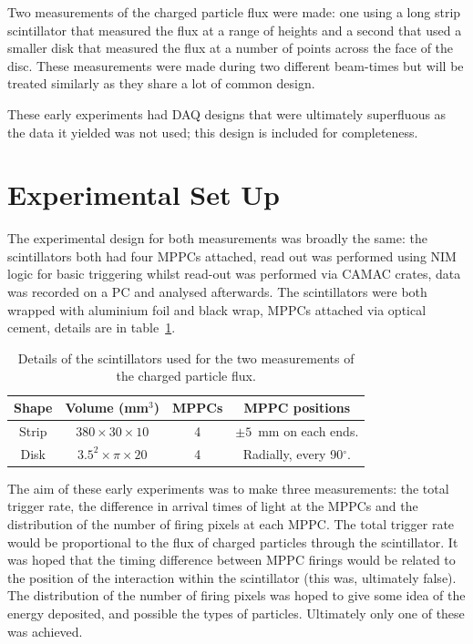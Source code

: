 Two measurements of the charged particle flux were made: one using a long strip scintillator that measured the flux at a range of heights and a second that used a smaller disk that measured the flux at a number of points across the face of the disc. These measurements were made during two different beam-times but will be treated similarly as they share a lot of common design.

These early experiments had DAQ designs that were ultimately superfluous as the data it yielded was not used; this design is included for completeness.
\section{Experimental Set Up} %
\label{sec:experimental_set_up}
The experimental design for both measurements was broadly the same: the scintillators both had four MPPCs attached, read out was performed using NIM logic for basic triggering whilst read-out was performed via CAMAC crates, data was recorded on a PC and analysed afterwards. The scintillators were both wrapped with aluminium foil and black wrap, MPPCs attached via optical cement, details are in table~\ref{tab:charged_particle_flux_scint_details}.
\begin{table}
    \begin{center}
    \begin{tabular}{c|c|c|c}
        Shape  &  Volume (mm\(^3\))            &  MPPCs  &  MPPC positions                    \\
        \hline
        Strip  &  \(380 \times30\times10\)     &  4      &  \( \pm 5 \)~mm on each ends.      \\
        Disk   &  \( 3.5^2\times\pi\times20\)  &  4      &  Radially, every 90\( ^{\circ} \). \\
        
    \end{tabular}
    \end{center}
    \caption{Details of the scintillators used for the two measurements of the charged particle flux.}
    \label{tab:charged_particle_flux_scint_details}
\end{table}

The aim of these early experiments was to make three measurements: the total trigger rate, the difference in arrival times of light at the MPPCs and the distribution of the number of firing pixels at each MPPC. The total trigger rate would be proportional to the flux of charged particles through the scintillator. It was hoped that the timing difference between MPPC firings would be related to the position of the interaction within the scintillator (this was, ultimately false). The distribution of the number of firing pixels was hoped to give some idea of the energy deposited, and possible the types of particles. Ultimately only one of these was achieved.

